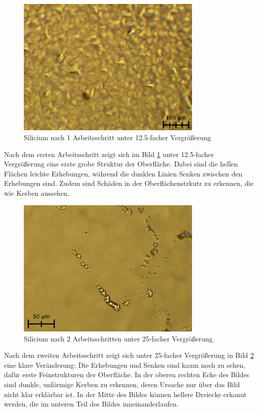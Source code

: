 \documentclass[german, %
parskip=full, %
bibliography=totoc, %
]{scrartcl}
\begin{document}
\begin{figure}[ht] 
  \centering
     \includegraphics[width=0.8\textwidth]{Silicium_1_12}
  \caption{Silicium nach 1 Arbeitsschritt unter 12.5-facher Vergrößerung}
  \label{fig:sil112}
\end{figure}

Nach dem ersten Arbeitsschritt zeigt sich im Bild \ref{fig:sil112} unter 12.5-facher Vergrößerung eine erste grobe Struktur der Oberfläche. Dabei sind die hellen Flächen leichte Erhebungen, während die dunklen Linien Senken zwischen den Erhebungen sind. Zudem sind Schäden in der Oberflächenstrkutr zu erkennen, die wie Kerben aussehen.

\begin{figure}[ht] 
  \centering
     \includegraphics[width=0.8\textwidth]{Silicium_2_25}
  \caption{Silicium nach 2 Arbeitsschritten unter 25-facher Vergrößerung}
  \label{fig:sil225}
\end{figure}

Nach dem zweiten Arbeitsschritt zeigt sich unter 25-facher Vergrößerung in Bild \ref{fig:sil225} eine klare Veränderung: Die Erhebungen und Senken sind kaum noch zu sehen, dafür erste Feinstrukturen der Oberfläche. In der oberen rechten Ecke des Bildes sind dunkle, unförmige Kerben zu erkennen, deren Ursache nur über das Bild nicht klar erklärbar ist. In der Mitte des Bildes können hellere Dreiecke erkannt werden, die im unteren Teil des Bildes inneinanderlaufen. 
\end{document}

